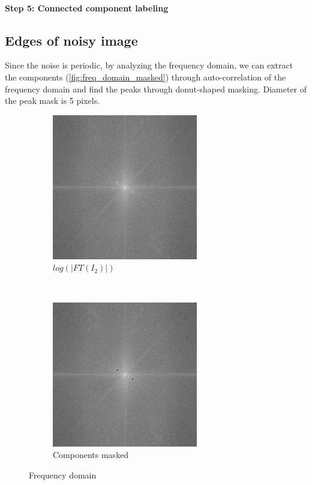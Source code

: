 \documentclass[12pt]{article}
\begin{document}
\paragraph*{Step 5: Connected component labeling}

\subsection*{Edges of noisy image}
Since the noise is periodic, by analyzing the frequency domain, we can extract the components (\autoref{fig:freq_domain_masked}) through auto-correlation of the frequency domain and find the peaks through donut-shaped masking. Diameter of the peak mask is 5 pixels.
\begin{figure}[H]
    \centering
    \begin{subfigure}[t]{0.5\textwidth}
        \centering
        \includegraphics[height=2.5in]{images/log_abs_I2}
        \caption{$log(\vert FT(I_2) \vert)$}
    \end{subfigure}%
    ~
    \begin{subfigure}[t]{0.5\textwidth}
        \centering
        \includegraphics[height=2.5in]{images/mask_X}
        \caption{Components masked}
        \label{fig:freq_domain_masked}
    \end{subfigure}
    \caption{Frequency domain}
\end{figure}
\end{document}

